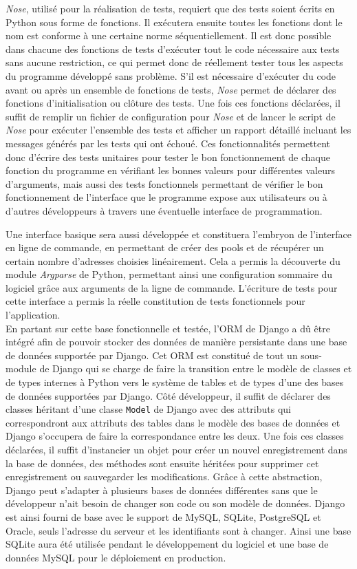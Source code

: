 \documentclass[12pt,a4paper,twoside]{report}
\begin{document}
\emph{Nose}, utilisé pour la réalisation de tests, requiert que des tests
soient écrits en Python sous forme de fonctions. Il exécutera ensuite toutes
les fonctions dont le nom est conforme à une certaine norme séquentiellement.
Il est donc possible dans chacune des fonctions de tests d’exécuter tout le
code nécessaire aux tests sans aucune restriction, ce qui permet donc de
réellement tester tous les aspects du programme développé sans problème. S’il
est nécessaire d’exécuter du code avant ou après un ensemble de fonctions de
tests, \emph{Nose} permet de déclarer des fonctions d’initialisation ou clôture
des tests. Une fois ces fonctions déclarées, il suffit de remplir un fichier
de configuration pour \emph{Nose} et de lancer le script de \emph{Nose} pour
exécuter l’ensemble des tests et afficher un rapport détaillé incluant les
messages générés par les tests qui ont échoué. Ces fonctionnalités permettent
donc d’écrire des tests unitaires pour tester le bon fonctionnement de chaque
fonction du programme en vérifiant les bonnes valeurs pour différentes valeurs
d’arguments, mais aussi des tests fonctionnels permettant de vérifier le bon
fonctionnement de l’interface que le programme expose aux utilisateurs ou à
d’autres développeurs à travers une éventuelle interface de programmation.

Une interface basique sera aussi développée et constituera l’embryon de
l’interface en ligne de commande, en permettant de créer des pools et de
récupérer un certain nombre d’adresses choisies linéairement. Cela a permis la
découverte du module \emph{Argparse} de Python, permettant ainsi une
configuration sommaire du logiciel grâce aux arguments de la ligne de commande.
L’écriture de tests pour cette interface a permis la réelle constitution de
tests fonctionnels pour l’application.\\

En partant sur cette base fonctionnelle et testée, l’ORM de Django a dû être
intégré afin de pouvoir stocker des données de manière persistante dans une
base de données supportée par Django. Cet ORM est constitué de tout un
sous-module de Django qui se charge de faire la transition entre le modèle de
classes et de types internes à Python vers le système de tables et de types
d’une des bases de données supportées par Django. Côté développeur, il suffit
de déclarer des classes héritant d’une classe \verb+Model+ de Django avec des
attributs qui correspondront aux attributs des tables dans le modèle des bases
de données et Django s’occupera de faire la correspondance entre les deux. Une
fois ces classes déclarées, il suffit d’instancier un objet pour créer un
nouvel enregistrement dans la base de données, des méthodes sont ensuite
héritées pour supprimer cet enregistrement ou sauvegarder les modifications.
Grâce à cette abstraction, Django peut s’adapter à plusieurs bases de données
différentes sans que le développeur n’ait besoin de changer son code ou son
modèle de données. Django est ainsi fourni de base avec le support de MySQL,
SQLite, PostgreSQL et Oracle, seuls l’adresse du serveur et les identifiants
sont à changer. Ainsi une base SQLite aura été utilisée pendant le
développement du logiciel et une base de données MySQL pour le déploiement en
production.
\end{document}

